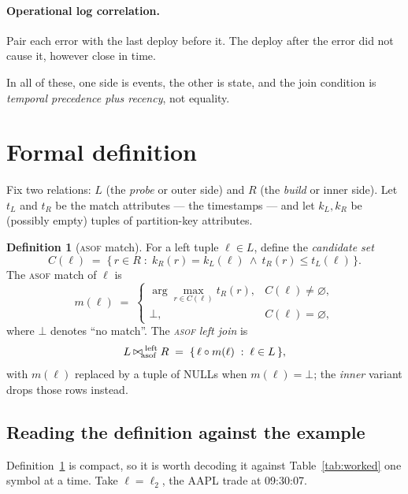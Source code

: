 \documentclass[11pt,a4paper]{report}
\theoremstyle{definition}
\newtheorem{definition}{Definition}[chapter]
\theoremstyle{plain}
\newcommand{\asof}{{\normalfont\scshape asof}}
\begin{document}
\paragraph{Operational log correlation.} Pair each error with the last deploy before it. The
deploy after the error did not cause it, however close in time.

In all of these, one side is events, the other is state, and the join condition is
\emph{temporal precedence plus recency}, not equality.

\section{Formal definition}

Fix two relations: $L$ (the \emph{probe} or outer side) and $R$ (the \emph{build} or inner
side). Let $t_L$ and $t_R$ be the match attributes --- the timestamps --- and let
$k_L, k_R$ be (possibly empty) tuples of partition-key attributes.

\begin{definition}[\asof{} match]\label{def:asof}
For a left tuple $\ell \in L$, define the \emph{candidate set}
\[
  C(\ell) \;=\; \{\, r \in R \;:\; k_R(r) = k_L(\ell) \ \wedge\ t_R(r) \le t_L(\ell) \,\}.
\]
The \asof{} match of $\ell$ is
\[
  m(\ell) \;=\;
  \begin{cases}
    \arg\max_{r \in C(\ell)} t_R(r), & C(\ell) \neq \varnothing,\\[2pt]
    \bot, & C(\ell) = \varnothing,
  \end{cases}
\]
where $\bot$ denotes ``no match''. The \emph{\asof{} left join} is
\[
  L \mathbin{\raisebox{0.1ex}{$\bowtie$}_{\!\text{asof}}^{\;\text{left}}} R
  \;=\; \{\, \ell \circ m(\ell) \;:\; \ell \in L \,\},
\]
with $m(\ell)$ replaced by a tuple of NULLs when $m(\ell) = \bot$; the \emph{inner} variant
drops those rows instead.
\end{definition}

\subsection{Reading the definition against the example}

Definition~\ref{def:asof} is compact, so it is worth decoding it against
Table~\ref{tab:worked} one symbol at a time. Take $\ell = \ell_2$, the AAPL trade at
09:30:07.
\end{document}
